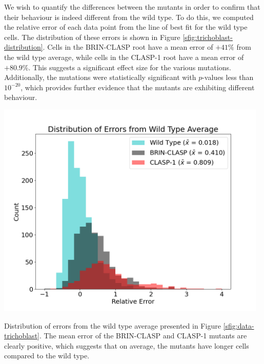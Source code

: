 \medskip

We wish to quantify the differences between the mutants in order to confirm that their behaviour is indeed different from the wild type. To do this, we computed the relative error of each data point from the line of best fit for the wild type cells. The distribution of these errors is shown in Figure \ref{sfig:trichoblast-distribution}. Cells in the BRIN-CLASP root have a mean error of $+41\%$ from the wild type average, while cells in the CLASP-1 root have a mean error of $+80.9\%$. This suggests a significant effect size for the various mutations. Additionally, the mutations were statistically significant with $p$-values less than $10^{-20}$, which provides further evidence that the mutants are exhibiting different behaviour.

\begin{supplementaryfigure}
    \centering
    \includegraphics[width=13cm]{img/trichoblast-distribution.png}
    \caption{Distribution of errors from the wild type average presented in Figure \ref{sfig:data-trichoblast}. The mean error of the BRIN-CLASP and CLASP-1 mutants are clearly positive, which suggests that on average, the mutants have longer cells compared to the wild type. }
    \label{sfig:trichoblast-distribution}
\end{supplementaryfigure}


